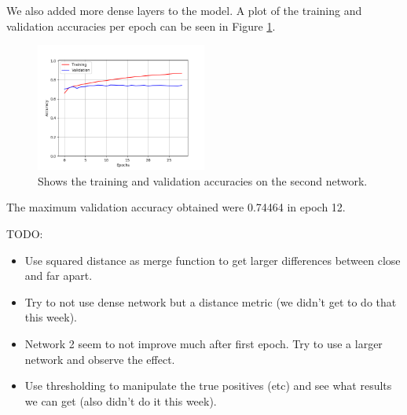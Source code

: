 We also added more dense layers to the model. A plot of the
training and validation accuracies per epoch can be seen in Figure
\ref{fig:network2_accuracies}.

\begin{figure}
    \centering
    \includegraphics[width=0.5\textwidth]{./pictures/method/network_2_accuracies.png}
    \caption{Shows the training and validation accuracies on the second
        network.}
    \label{fig:network2_accuracies}
\end{figure}

The maximum validation accuracy obtained were 0.74464 in epoch 12.


TODO:
\begin{itemize}
    \item Use squared distance as merge function to get larger differences
        between close and far apart.
    \item Try to not use dense network but a distance metric (we didn't get to
        do that this week).
    \item Network 2 seem to not improve much after first epoch. Try to use a
        larger network and observe the effect.
    \item Use thresholding to manipulate the true positives (etc) and see what
        results we can get (also didn't do it this week).
\end{itemize}

